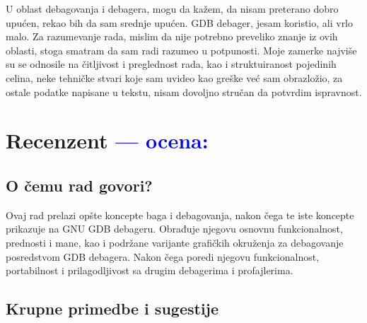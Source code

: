 \documentclass[a4paper]{report}
\newcommand{\odgovor}[1]{\textcolor{blue}{#1}}
\begin{document}
U oblast debagovanja i  debagera, mogu da kažem, da nisam preterano dobro upućen, rekao bih da sam srednje upućen. GDB debager, jesam koristio, ali vrlo malo. Za razumevanje rada, mislim da nije potrebno preveliko znanje iz ovih oblasti, stoga smatram da sam radi razumeo u potpunosti. Moje zamerke najviše su se odnosile na čitljivost i preglednost rada, kao i struktuiranost pojedinih celina, neke tehničke stvari koje sam uvideo kao greške već sam obrazložio, za ostale podatke napisane u tekstu, nisam dovoljno stručan da potvrdim ispravnost.   

\chapter{Recenzent \odgovor{--- ocena:} }


\section{O čemu rad govori?}

Ovaj rad prelazi opšte koncepte baga i debagovanja, nakon čega te iste koncepte prikazuje na GNU GDB debageru. Obrađuje njegovu osnovnu funkcionalnost, prednosti i mane, kao i podržane varijante grafičkih okruženja za debagovanje posredstvom GDB debagera. Nakon čega poredi njegovu funkcionalnost, portabilnost i prilagodljivost sa drugim debagerima i profajlerima.
\section{Krupne primedbe i sugestije}
\end{document}
